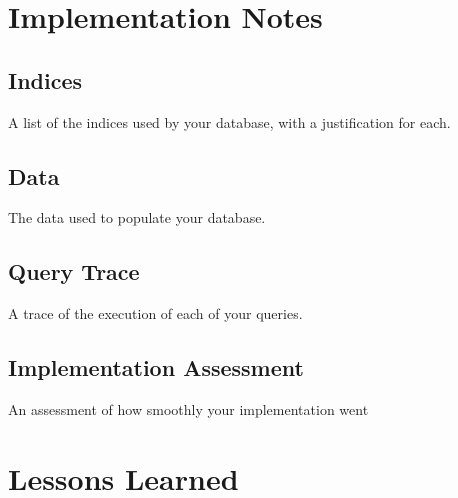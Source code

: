 \documentclass[11pt, a4paper]{report}
\begin{document}
\chapter{Implementation Notes}
\section{Indices}
    A list of the indices used by your database, with a justification for each.
\section{Data}
    The data used to populate your database.
\section{Query Trace}
    A trace of the execution of each of your queries.
\section{Implementation Assessment}
    An assessment of how smoothly your implementation went

\chapter{Lessons Learned}
\end{document}

